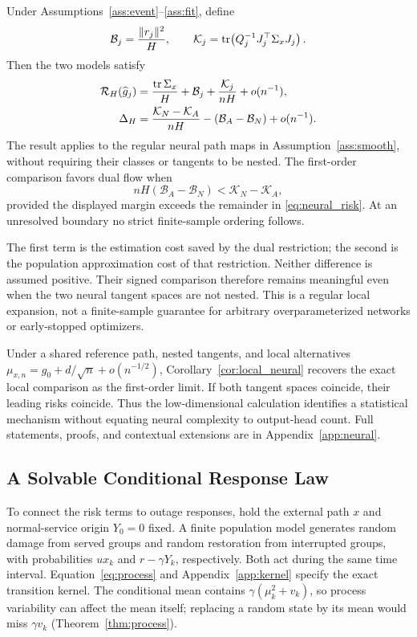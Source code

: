 \begin{theorem}
\label{thm:neural}
Under Assumptions~\ref{ass:event}--\ref{ass:fit}, define
\[
 \mathcal B_j=\frac{\|r_j\|^2}{H},\qquad
 \mathcal K_j=\operatorname{tr}\!\left(Q_j^{-1}J_j^\top\Sigma_xJ_j\right).
\]
Then the two models satisfy
\begin{equation}
 \begin{aligned}
 \mathcal R_H(\widehat g_j)
 &=\frac{\operatorname{tr}\Sigma_x}{H}+\mathcal B_j
       +\frac{\mathcal K_j}{nH}+o(n^{-1}),\\
 \Delta_H
 &=\frac{\mathcal K_N-\mathcal K_A}{nH}
       -(\mathcal B_A-\mathcal B_N)+o(n^{-1}).
 \end{aligned}
 \label{eq:neural_risk}
\end{equation}
The result applies to the regular neural path maps in Assumption~\ref{ass:smooth}, without requiring their classes or tangents to be nested. The first-order comparison favors dual flow when
\begin{equation}
 nH(\mathcal B_A-\mathcal B_N)<\mathcal K_N-\mathcal K_A,
 \label{eq:neural_choice}
\end{equation}
provided the displayed margin exceeds the remainder in \eqref{eq:neural_risk}. At an unresolved boundary no strict finite-sample ordering follows.
\end{theorem}
The first term is the estimation cost saved by the dual restriction; the second is the population approximation cost of that restriction. Neither difference is assumed positive. Their signed comparison therefore remains meaningful even when the two neural tangent spaces are not nested. This is a regular local expansion, not a finite-sample guarantee for arbitrary overparameterized networks or early-stopped optimizers.

Under a shared reference path, nested tangents, and local alternatives $\mu_{x,n}=g_0+d/\sqrt n+o(n^{-1/2})$, Corollary~\ref{cor:local_neural} recovers the exact local comparison as the first-order limit. If both tangent spaces coincide, their leading risks coincide. Thus the low-dimensional calculation identifies a statistical mechanism without equating neural complexity to output-head count. Full statements, proofs, and contextual extensions are in Appendix~\ref{app:neural}.

\subsection{A Solvable Conditional Response Law}
To connect the risk terms to outage responses, hold the external path $x$ and normal-service origin $Y_0=0$ fixed. A finite population model generates random damage from served groups and random restoration from interrupted groups, with probabilities $ux_k$ and $r-\gamma Y_k$, respectively. Both act during the same time interval. Equation~\eqref{eq:process} and Appendix~\ref{app:kernel} specify the exact transition kernel. The conditional mean contains $\gamma(\mu_k^2+v_k)$, so process variability can affect the mean itself; replacing a random state by its mean would miss $\gamma v_k$ (Theorem~\ref{thm:process}).

